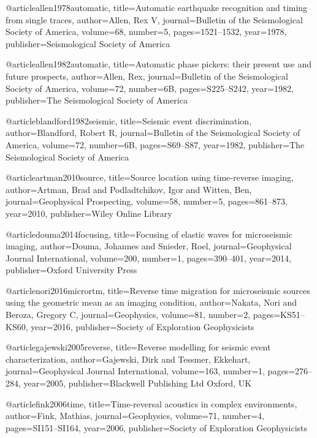 @article{allen1978automatic,
  title={Automatic earthquake recognition and timing from single traces},
  author={Allen, Rex V},
  journal={Bulletin of the Seismological Society of America},
  volume={68},
  number={5},
  pages={1521--1532},
  year={1978},
  publisher={Seismological Society of America}
}

@article{allen1982automatic,
  title={Automatic phase pickers: their present use and future prospects},
  author={Allen, Rex},
  journal={Bulletin of the Seismological Society of America},
  volume={72},
  number={6B},
  pages={S225--S242},
  year={1982},
  publisher={The Seismological Society of America}
}

@article{blandford1982seismic,
  title={Seismic event discrimination},
  author={Blandford, Robert R},
  journal={Bulletin of the Seismological Society of America},
  volume={72},
  number={6B},
  pages={S69--S87},
  year={1982},
  publisher={The Seismological Society of America}
}

@article{artman2010source,
  title={Source location using time-reverse imaging},
  author={Artman, Brad and Podladtchikov, Igor and Witten, Ben},
  journal={Geophysical Prospecting},
  volume={58},
  number={5},
  pages={861--873},
  year={2010},
  publisher={Wiley Online Library}
}

@article{douma2014focusing,
  title={Focusing of elastic waves for microseismic imaging},
  author={Douma, Johannes and Snieder, Roel},
  journal={Geophysical Journal International},
  volume={200},
  number={1},
  pages={390--401},
  year={2014},
  publisher={Oxford University Press}
}

@article{nori2016micrortm,
  title={Reverse time migration for microseismic sources using the geometric mean as an imaging condition},
  author={Nakata, Nori and Beroza, Gregory C},
  journal={Geophysics},
  volume={81},
  number={2},
  pages={KS51--KS60},
  year={2016},
  publisher={Society of Exploration Geophysicists}
}


@article{gajewski2005reverse,
  title={Reverse modelling for seismic event characterization},
  author={Gajewski, Dirk and Tessmer, Ekkehart},
  journal={Geophysical Journal International},
  volume={163},
  number={1},
  pages={276--284},
  year={2005},
  publisher={Blackwell Publishing Ltd Oxford, UK}
}


@article{fink2006time,
  title={Time-reversal acoustics in complex environments},
  author={Fink, Mathias},
  journal={Geophysics},
  volume={71},
  number={4},
  pages={SI151--SI164},
  year={2006},
  publisher={Society of Exploration Geophysicists}
}

